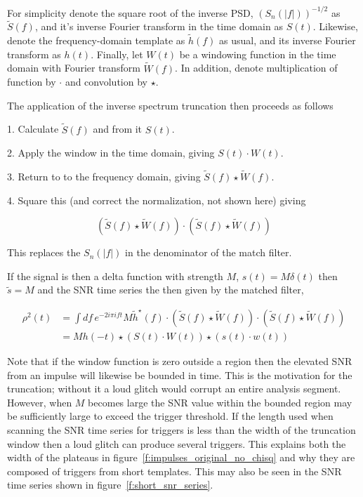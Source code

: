For simplicity denote the square root of the inverse PSD,
$(S_n(|f|))^{-1/2}$ as $\tilde{S}(f)$, and it's inverse Fourier
transform in the time domain as $S(t)$.  Likewise, denote the
frequency-domain template as $\tilde{h}(f)$ as usual, and its inverse
Fourier transform as $h(t)$.  Finally, let $W(t)$ be a windowing
function in the time domain with Fourier transform $\tilde{W}(f)$.  In
addition, denote multiplication of function by $\cdot$ and convolution
by $\star$.

The application of the inverse spectrum truncation then proceeds as
follows 

1. Calculate $\tilde{S}(f)$ and from it $S(t)$.

2. Apply the window in the time domain, giving $S(t) \cdot W(t)$.

3. Return to to the frequency domain, giving $\tilde{S}(f) \star
\tilde{W}(f)$.

4. Square this (and correct the normalization, not shown here) giving 

\begin{equation*}
(\tilde{S}(f) \star \tilde{W}(f)) \cdot (\tilde{S}(f) \star \tilde{W}(f)) 
\end{equation*}

This replaces the $S_n(|f|)$ in the denominator of the match filter.

If the signal is then a delta function with strength $M$, $s(t) = M
\delta(t)$ then $\tilde{s} = M$  and the SNR time series the then
given by the matched filter,


\begin{align*}
\rho^2(t) &= \int df\, e^{-2 i\pi i f t} M \tilde{h}^\star(f) \cdot
(\tilde{S}(f) \star \tilde{W}(f)) \cdot 
(\tilde{S}(f) \star \tilde{W}(f)) \\
&= M h(-t) \star
(S(t) \cdot W(t)) \star
(s(t) \cdot w(t))
\end{align*}

Note that if the window function is zero outside a region then the
elevated SNR from an impulse will likewise be bounded in time.  This
is the motivation for the truncation; without it a loud glitch would
corrupt an entire analysis segment.  However, when $M$ becomes large
the SNR value within the bounded region may be sufficiently large to
exceed the trigger threshold.  If the length used when scanning the
SNR time series for triggers is less than the width of the truncation
window then a loud glitch can produce several triggers.  This explains
both the width of the plateaus in
figure~\ref{f:impulses_original_no_chisq} and why they are composed of
triggers from short templates.  This may also be seen in the SNR time
series shown in figure~\ref{f:short_snr_series}.

